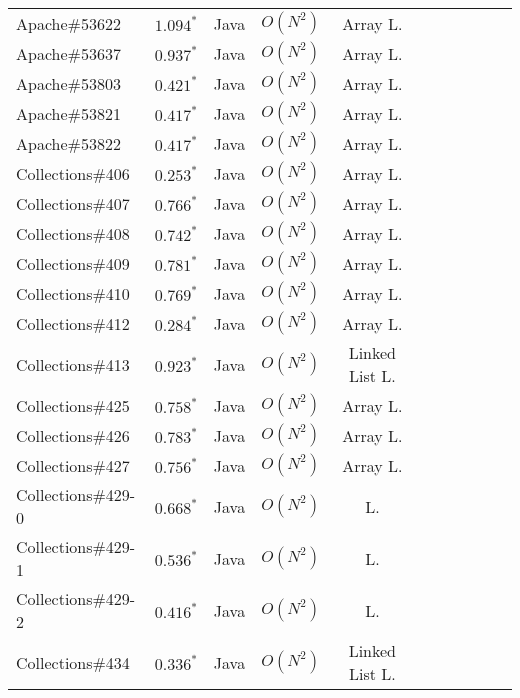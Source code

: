 \begin{table*}[h!]
{{\begin{tabular}{lcccc|ccc|ccc}
    \midrule
    \midrule
    Apache\#53622     & $1.094^*$  & Java  & $O(N^{2})$ & Array L.                 &  &  &  &  &  &      \\
    Apache\#53637     & $0.937^*$  & Java  & $O(N^{2})$ & Array L.                 &  &  &  &  &  &   \\
    Apache\#53803     & $0.421^*$  & Java  & $O(N^{2})$ & Array L.                 &  &  &  &  &  &      \\
    Apache\#53821     & $0.417^*$  & Java  & $O(N^{2})$ & Array L.                &  &  &  &  &  &       \\
    Apache\#53822     & $0.417^*$  & Java  & $O(N^{2})$ & Array L.                &  &  &  &  &  &       \\
    \midrule
    Collections\#406      & $0.253^*$  & Java & $O(N^{2})$ & Array L. &  &  &  &  &  &        \\
    Collections\#407      & $0.766^*$  & Java & $O(N^{2})$ & Array L. &  &  &  &  &  &    \\
    Collections\#408      & $0.742^*$  & Java & $O(N^{2})$ & Array L. &  &  &  &  &  &     \\
    Collections\#409      & $0.781^*$  & Java & $O(N^{2})$ & Array L. &  &  &  &  &  &      \\
    Collections\#410      & $0.769^*$  & Java  & $O(N^{2})$ & Array L. &  &  &  &  &  &    \\
    Collections\#412      & $0.284^*$  & Java & $O(N^{2})$ & Array L.  &  &  &  &  &  &     \\
    Collections\#413      & $0.923^*$  & Java & $O(N^{2})$ & Linked List L. &  &  &  &  &  &    \\
    Collections\#425      & $0.758^*$  & Java & $O(N^{2})$ & Array L. &  &  &  &  &  &     \\
    Collections\#426      & $0.783^*$  & Java & $O(N^{2})$ & Array L. &  &  &  &  &  &    \\
    Collections\#427      & $0.756^*$  & Java  & $O(N^{2})$ & Array L. &  &  &  &  &  &   \\
    Collections\#429-0    & $0.668^*$  & Java & $O(N^{2})$ & L. &  &  &  &  &  &       \\
    Collections\#429-1    & $0.536^*$  & Java & $O(N^{2})$ & L. &  &  &  &  &  &     \\
    Collections\#429-2    & $0.416^*$  & Java  & $O(N^{2})$ & L. &  &  &  &  &  &  \\
    Collections\#434      & $0.336^*$  & Java & $O(N^{2})$ & Linked List L. &  &  &  &  &  &     \\

\end{tabular}}}
\end{table*}
